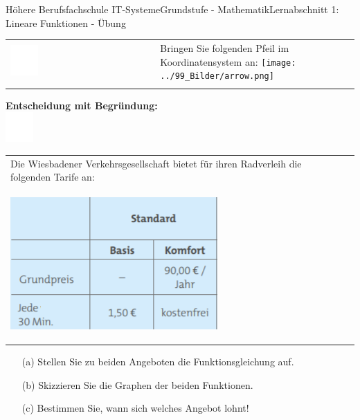 \documentclass[oneside,openany,headings=optiontotoc,11pt,numbers=noenddot]{scrreprt}
\begin{document}
\begin{worksheet}{Höhere Berufsfachschule IT-Systeme}{Grundstufe - Mathematik}{Lernabschnitt 1: Lineare Funktionen - Übung}
\begin{framed}
\begin{tabularx}{\textwidth}{X|L{3cm}|}
				\includegraphics[width=0.2\textwidth]{../../empty.jpg} & Bringen Sie folgenden Pfeil im Koordinatensystem an: \texttt{[image: ../99\_Bilder/arrow.png]}\\
				&\\
			\end{tabularx}
			\par\bigskip\noindent
			\textbf{Entscheidung mit Begründung:}\\
			\includegraphics[width=0.08\textwidth]{../../empty.jpg}
		\end{framed}
		\normalsize
		\newpage
		\begin{framed}
			\noindent
			\begin{tabularx}{\textwidth}{Xr}
				Die Wiesbadener Verkehrsgesellschaft bietet für ihren Radverleih die folgenden Tarife an:\\
				\begin{centering}
					\includegraphics{../99_Bilder/eswe.png}
				\end{centering}
			\end{tabularx}
			\begin{itemize}
				\item[(a)] Stellen Sie zu beiden Angeboten die Funktionsgleichung auf.
				\item[(b)] Skizzieren Sie die Graphen der beiden Funktionen.
				\item[(c)] Bestimmen Sie, wann sich welches Angebot lohnt!
			\end{itemize}
		\end{framed}

\end{worksheet}
\end{document}
